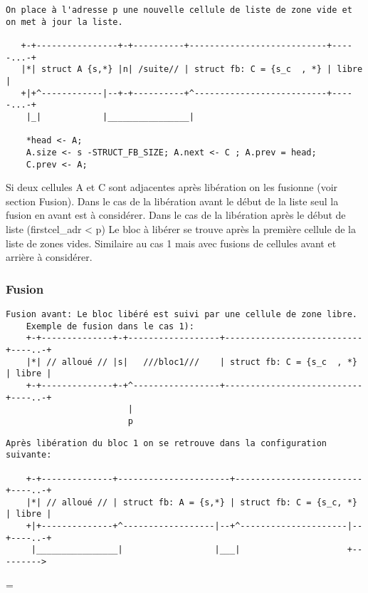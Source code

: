 \documentclass[11pt]{article}
\newenvironment{absolutelynopagebreak}
  {\par\nobreak\vfil\penalty0\vfilneg
   \vtop\bgroup}
  {\par\xdef\tpd{\the\prevdepth}\egroup
   \prevdepth=\tpd}
\theoremstyle{definition}
\begin{document}
\begin{lstlisting}[columns=fixed,basicstyle=\scriptsize\ttfamily]
   On place à l'adresse p une nouvelle cellule de liste de zone vide et on met à jour la liste.

   +-+----------------+-+----------+---------------------------+-----...-+
   |*| struct A {s,*} |n| /suite// | struct fb: C = {s_c  , *} | libre   |
   +|+^------------|--+-+----------+^--------------------------+-----...-+
    |_|            |________________|

    *head <- A;
    A.size <- s -STRUCT_FB_SIZE; A.next <- C ; A.prev = head;
    C.prev <- A;
\end{lstlisting}
Si deux cellules A et C sont adjacentes après libération on les fusionne (voir section Fusion).
Dans le cas de la libération avant le début de la liste seul la fusion en avant est à considérer.
Dans le cas de la libération après le début de liste (firstcel\_adr < p)
Le bloc à libérer se trouve après la première cellule de la liste de zones vides.
Similaire au cas 1 mais avec fusions de cellules avant et arrière à considérer.
   
\subsubsection{Fusion}


\begin{lstlisting}[columns=fixed,basicstyle=\scriptsize\ttfamily]
  Fusion avant: Le bloc libéré est suivi par une cellule de zone libre.
    Exemple de fusion dans le cas 1):
    +-+--------------+-+------------------+---------------------------+----..-+
    |*| // alloué // |s|   ///bloc1///    | struct fb: C = {s_c  , *} | libre |
    +-+--------------+-+^-----------------+---------------------------+----..-+
                        |
                        p
\end{lstlisting}

\begin{absolutelynopagebreak}
\begin{lstlisting}[columns=fixed,basicstyle=\scriptsize\ttfamily]
    Après libération du bloc 1 on se retrouve dans la configuration suivante:

    +-+--------------+----------------------+-------------------------+----..-+
    |*| // alloué // | struct fb: A = {s,*} | struct fb: C = {s_c, *} | libre |
    +|+--------------+^------------------|--+^---------------------|--+----..-+
     |________________|                  |___|                     +--------->
\end{lstlisting}
\end{absolutelynopagebreak}
\end{document}
